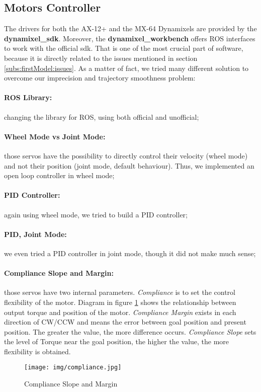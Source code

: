 \subsection{Motors Controller}
The drivers for both the AX-12+ and the MX-64 Dynamixels are provided by the \textbf{dynamixel\_sdk}. Moreover, the \textbf{dynamixel\_workbench} offers ROS interfaces to work with the official sdk. That is one of the most crucial part of software, because it is directly related to the issues mentioned in section \ref{subs:firstModel:issues}. As a matter of fact, we tried many different solution to overcome our imprecision and trajectory smoothness problem:
\paragraph{ROS Library:} changing the library for ROS, using both official and unofficial;
\paragraph{Wheel Mode vs Joint Mode:} those servos have the possibility to directly control their velocity (wheel mode) and not their position (joint mode, default behaviour). Thus, we implemented an open loop controller in wheel mode;
\paragraph{PID Controller:} again using wheel mode, we tried to build a PID controller;
\paragraph{PID, Joint Mode:} we even tried a PID controller in joint mode, though it did not make much sense;
\paragraph{Compliance Slope and Margin:} those servos have two internal parameters. \emph{Compliance} is to set the control flexibility of the motor.
Diagram in figure \ref{fig:compliance} shows the relationship between output torque and position of the motor. \emph{Compliance Margin} exists in each direction of CW/CCW and means the error between goal position and present position. The greater the value, the more difference occurs. \emph{Compliance Slope} sets the level of Torque near the goal position, the higher the value, the more flexibility is obtained.
\begin{figure}
	\centering
	\texttt{[image: img/compliance.jpg]}%
	\caption{Compliance Slope and Margin}
	\label{fig:compliance}
\end{figure}
\\

